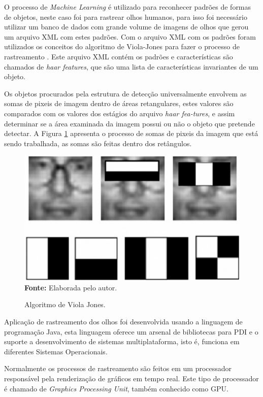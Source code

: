 O processo de \textit{Machine Learning} é utilizado para reconhecer padrões de formas de objetos, neste caso foi para rastrear olhos humanos, para isso foi necessário utilizar um banco de dados com grande volume de imagens de olhos que gerou um arquivo XML com estes padrões. Com o arquivo XML com os padrões foram utilizados os conceitos do algoritmo de Viola-Jones para fazer o processo de rastreamento \cite{viola2001rapid}. Este arquivo XML contém os padrões e características são chamados de \textit{haar features}, que são uma lista de características invariantes de um objeto.

Os objetos procurados pela estrutura de detecção universalmente envolvem as somas de pixeis de imagem dentro de áreas retangulares, estes valores são comparados com os valores dos estágios do arquivo \textit{haar fea-tures}, e assim determinar se a área examinada da imagem possui ou não o objeto que pretende detectar. A Figura \ref{fig:viola-jones-ret} apresenta o processo de somas de pixeis da imagem que está sendo trabalhada, as somas são feitas dentro dos retângulos. 

\begin{figure}[htbp]
\caption{Algoritmo de Viola Jones.} 
\centering \includegraphics[scale=1]{img/viola-jones-ret.png}
{\fontsize{11}{11}\selectfont \textbf{Fonte:} Elaborada pelo autor.}
\label{fig:viola-jones-ret}
\end{figure}

Aplicação de rastreamento dos olhos foi desenvolvida usando a linguagem de programação Java, esta linguagem oferece um arsenal de bibliotecas para PDI e o suporte a desenvolvimento de sistemas multiplataforma, isto é, funciona em diferentes Sistemas Operacionais. 

Normalmente os processos de rastreamento são feitos em um processador responsável pela renderização de gráficos em tempo real. Este tipo de processador é chamado de \textit{Graphics Processing Unit}, também conhecido como GPU.

